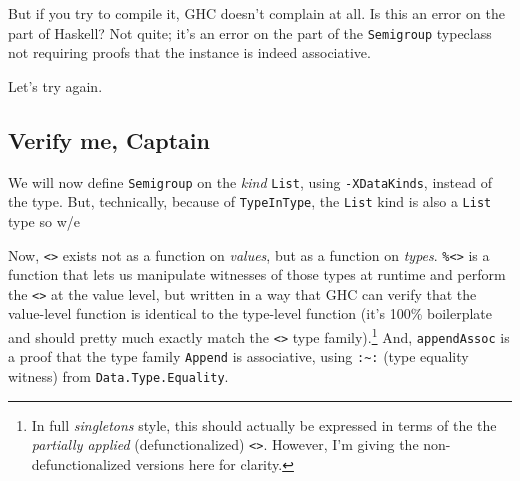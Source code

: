 \documentclass[]{article}
\newenvironment{Shaded}{}{}
\newcommand{\KeywordTok}[1]{\textcolor[rgb]{0.00,0.44,0.13}{\textbf{{#1}}}}
\newcommand{\DataTypeTok}[1]{\textcolor[rgb]{0.56,0.13,0.00}{{#1}}}
\newcommand{\OtherTok}[1]{\textcolor[rgb]{0.00,0.44,0.13}{{#1}}}
\newcommand{\FunctionTok}[1]{\textcolor[rgb]{0.02,0.16,0.49}{{#1}}}
\newcommand{\NormalTok}[1]{{#1}}
\begin{document}
But if you try to compile it, GHC doesn't complain at all. Is this an error on
the part of Haskell? Not quite; it's an error on the part of the
\texttt{Semigroup} typeclass not requiring proofs that the instance is indeed
associative.

Let's try again.

\subsection{Verify me, Captain}\label{verify-me-captain}

We will now define \texttt{Semigroup} on the \emph{kind} \texttt{List}, using
\texttt{-XDataKinds}, instead of the type. But, technically, because of
\texttt{TypeInType}, the \texttt{List} kind is also a \texttt{List} type so w/e

\begin{Shaded}
\end{Shaded}

Now, \texttt{\textless{}\textgreater{}} exists not as a function on
\emph{values}, but as a function on \emph{types}.
\texttt{\%\textless{}\textgreater{}} is a function that lets us manipulate
witnesses of those types at runtime and perform the
\texttt{\textless{}\textgreater{}} at the value level, but written in a way that
GHC can verify that the value-level function is identical to the type-level
function (it's 100\% boilerplate and should pretty much exactly match the
\texttt{\textless{}\textgreater{}} type family).\footnote{In full
  \emph{singletons} style, this should actually be expressed in terms of the the
  \emph{partially applied} (defunctionalized)
  \texttt{\textless{}\textgreater{}}. However, I'm giving the
  non-defunctionalized versions here for clarity.} And, \texttt{appendAssoc} is
a proof that the type family \texttt{Append} is associative, using
\texttt{:\textasciitilde{}:} (type equality witness) from
\texttt{Data.Type.Equality}.
\end{document}
